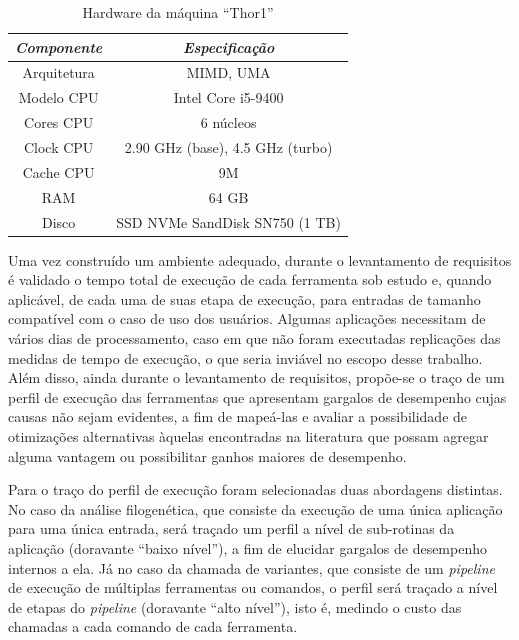 \documentclass[cic,tc]{iiufrgs}
\begin{document}
\begin{table}[h]
    \caption{Hardware da máquina ``Thor1''}
    \centering
        \begin{tabular}{c|c}
          \hline
          \textit{Componente}  &   \textit{Especificação} \\
          \hline
          \hline
          Arquitetura & MIMD, UMA \\
          Modelo CPU & Intel Core i5-9400 \\
          Cores CPU & 6 núcleos\\
          Clock CPU & 2.90 GHz (base), 4.5 GHz (turbo) \\
          Cache CPU & 9M \\
          RAM & 64 GB \\
          Disco & SSD NVMe SandDisk SN750 (1 TB) \\
          \hline
        \end{tabular}
    \label{tbl:thor1}
\end{table}

Uma vez construído um ambiente adequado, durante o levantamento de requisitos é
validado o tempo total de execução de cada ferramenta sob estudo e, quando
aplicável, de cada uma de suas etapa de execução, para entradas de tamanho
compatível com o caso de uso dos usuários. Algumas aplicações necessitam de
vários dias de processamento, caso em que não foram executadas replicações das
medidas de tempo de execução, o que seria inviável no escopo desse trabalho.
Além disso, ainda durante o levantamento de requisitos, propõe-se o traço de um
perfil de execução das ferramentas que apresentam gargalos de desempenho cujas
causas não sejam evidentes, a fim de mapeá-las e avaliar a possibilidade de
otimizações alternativas àquelas encontradas na literatura que possam agregar
alguma vantagem ou possibilitar ganhos maiores de desempenho.

Para o traço do perfil de execução foram selecionadas duas abordagens
distintas. No caso da análise filogenética, que consiste da execução de uma
única aplicação para uma única entrada, será traçado um perfil a nível de
sub-rotinas da aplicação (doravante ``baixo nível''), a fim de elucidar
gargalos de desempenho internos a ela. Já no caso da chamada de variantes, que
consiste de um \textit{pipeline} de execução de múltiplas ferramentas ou
comandos, o perfil será traçado a nível de etapas do \textit{pipeline}
(doravante ``alto nível''), isto é, medindo o custo das chamadas a cada comando
de cada ferramenta.
\end{document}
